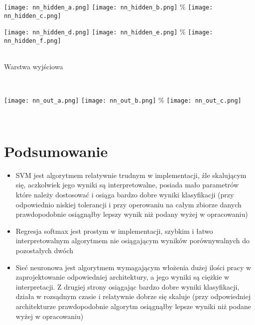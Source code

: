 \documentclass[11pt]{article}
\begin{document}

\texttt{[image: nn\_hidden\_a.png]} \endminipage\hfill
{}
\texttt{[image: nn\_hidden\_b.png]} \endminipage\hfill
{}\%
\texttt{[image: nn\_hidden\_c.png]} \endminipage


\texttt{[image: nn\_hidden\_d.png]} \endminipage\hfill
{}
\texttt{[image: nn\_hidden\_e.png]} \endminipage\hfill
{}\%
\texttt{[image: nn\_hidden\_f.png]} \endminipage

\\

Warstwa wyjściowa

\\


\texttt{[image: nn\_out\_a.png]} \endminipage\hfill
{}
\texttt{[image: nn\_out\_b.png]} \endminipage\hfill
{}\%
\texttt{[image: nn\_out\_c.png]} \endminipage

\\
\clearpage
    \hypertarget{podsumowanie}{%
\section{Podsumowanie}\label{podsumowanie}}

\begin{itemize}
\item
  SVM jest algorytmem relatywnie trudnym w implementacji, źle skalującym
  się, aczkolwiek jego wyniki są interpretowalne, posiada mało
  parametrów które należy dostosować i osiąga bardzo dobre wyniki
  klasyfikacji (przy odpowiednio niskiej tolerancji i przy operowaniu na
  całym zbiorze danych prawdopodobnie osiągnąłby lepszy wynik niż podany
  wyżej w opracowaniu)
\item
  Regresja softmax jest prostym w implementacji, szybkim i łatwo
  interpretowalnym algorytmem nie osiągającym wyników porównywalnych do
  pozostałych dwóch
\item
  Sieć neuronowa jest algorytmem wymagającym włożenia dużej ilości pracy
  w zaprojektowanie odpowiedniej architektury, a jego wyniki są ciężkie
  w interpretacji. Z drugiej strony osiągając bardzo dobre wyniki
  klasyfikacji, działa w rozsądnym czasie i relatywnie dobrze się
  skaluje (przy odpowiedniej architekturze prawdopodobnie algorytm
  osiągnąłby lepsze wyniki niż podane wyżej w opracowaniu)
\end{itemize}
\end{document}
